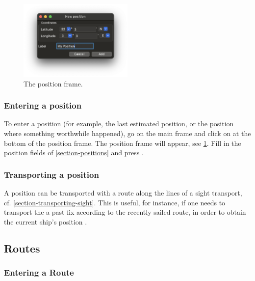 \documentclass{ol-softwaremanual}
\begin{document}
\begin{figure}
  \centering
  \includegraphics[width=0.5\textwidth]{figures/position-frame.png}
  \caption{
    \label{fig-position-frame}
    The position frame.  
  }
\end{figure}

\subsubsection{Entering a position}\label{section-enter-position}

To enter a position  (for example, the last estimated position, or the position where something worthwhile happened), go on the main frame and click on  at the bottom of the position frame. The position frame will appear, see \cref{fig-position-frame}. Fill in the position fields of \cref{section-positions} and press . 

\subsubsection{Transporting a position}\label{section-transport-position}

A position can be transported with a route along the lines of a sight transport, cf. \cref{section-transporting-sight}. This is useful, for instance, if one needs to transport the a past fix according to the recently sailed route, in order to obtain the current ship's position \cite{bowditch2002the}. 


\subsection{Routes}\label{section-routes}


\subsubsection{Entering a Route}\label{section-entering-route}
\end{document}
